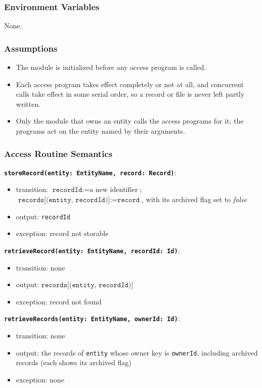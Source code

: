 \documentclass[12pt, titlepage]{article}
\begin{document}
\subsubsection{Environment Variables}
None.

\subsubsection{Assumptions}
\begin{itemize}
  \item The module is initialized before any access program is called.
  \item Each access program takes effect completely or not at all, and concurrent calls take effect in some serial order, so a record or file is never left partly written.
  \item Only the module that owns an entity calls the access programs for it; the programs act on the entity named by their arguments.
\end{itemize}

\subsubsection{Access Routine Semantics}

\textbf{\texttt{storeRecord(entity: EntityName, record: Record)}}:
\begin{itemize}
  \item transition: $\texttt{recordId} := \text{a new identifier}$; $\texttt{records[(entity, recordId)]} := \texttt{record}$, with its archived flag set to \textit{false}
  \item output: \texttt{recordId}
  \item exception: record not storable
\end{itemize}

\textbf{\texttt{retrieveRecord(entity: EntityName, recordId: Id)}}:
\begin{itemize}
  \item transition: none
  \item output: $\texttt{records[(entity, recordId)]}$
  \item exception: record not found
\end{itemize}

\textbf{\texttt{retrieveRecords(entity: EntityName, ownerId: Id)}}:
\begin{itemize}
  \item transition: none
  \item output: the records of \texttt{entity} whose owner key is \texttt{ownerId}, including archived records (each shows its archived flag)
  \item exception: none
\end{itemize}
\end{document}
